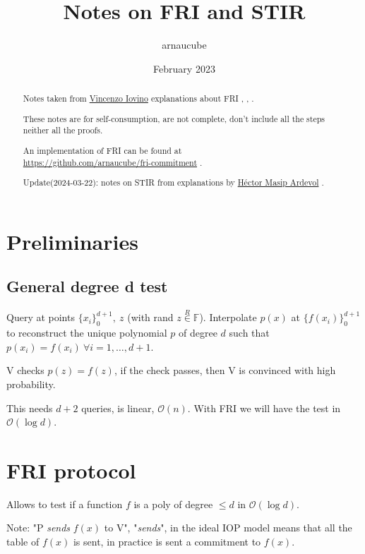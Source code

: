 \documentclass{article}
\title{Notes on FRI and STIR}
\author{arnaucube}
\date{February 2023}
\theoremstyle{definition}
\begin{document}
\maketitle

\begin{abstract}
	Notes taken from \href{https://sites.google.com/site/vincenzoiovinoit/}{Vincenzo Iovino} \cite{vincenzoiovino} explanations about FRI \cite{fri}, \cite{cryptoeprint:2022/1216}, \cite{cryptoeprint:2019/1020}.

	These notes are for self-consumption, are not complete, don't include all the steps neither all the proofs.

	An implementation of FRI can be found at\\ \href{https://github.com/arnaucube/fri-commitment}{https://github.com/arnaucube/fri-commitment} \cite{fri-impl}.

	Update(2024-03-22): notes on STIR \cite{cryptoeprint:2024/390} from explanations by \href{https://hecmas.github.io/}{Héctor Masip Ardevol} \cite{hectormasipardevol}.
\end{abstract}

\tableofcontents

\section{Preliminaries}
\subsection{General degree d test}

Query at points $\{ x_i \}_0^{d+1},~z$ (with rand $z \overset{R}{\in} \mathbb{F}$).
Interpolate $p(x)$ at $\{f(x_i)\}_0^{d+1}$ to reconstruct the unique polynomial $p$ of degree $d$ such that $p(x_i)=f(x_i)~\forall i=1, \ldots, d+1$.

V checks $p(z)=f(z)$, if the check passes, then V is convinced with high probability.

This needs $d+2$ queries, is linear, $\mathcal{O}(n)$. With FRI we will have the test in $\mathcal{O}(\log{}d)$.

\section{FRI protocol}
Allows to test if a function $f$ is a poly of degree $\leq d$ in $\mathcal{O}(\log{}d)$.

Note: "P \emph{sends} $f(x)$ to V", "\emph{sends}", in the ideal IOP model means that all the table of $f(x)$ is sent, in practice is sent a commitment to $f(x)$.
\end{document}
